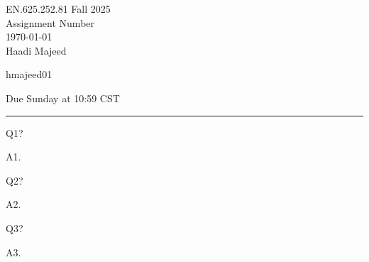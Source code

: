 \documentclass[12pt,letterpaper, onecolumn]{exam}
\begin{document}
\begingroup  
    \centering
    \LARGE EN.625.252.81 Fall 2025\\
    \LARGE Assignment Number\\[0.5em]
    \large \today\\[0.5em]
    \large Haadi Majeed\par
    \large hmajeed01\par
    \large Due Sunday at 10:59 CST\par
\endgroup
\rule{\textwidth}{0.4pt}
\printanswers
\renewcommand{\solutiontitle}{\noindent\textbf{Ans:}\enspace}

\begin{questions}

    \question Q1?
    
    \begin{solution}
            A1.
    \end{solution}
    
    \question Q2? 
    
    \begin{solution}
            A2.
    \end{solution}

    \question Q3?
    
    \begin{solution}
            A3.
    \end{solution}
    
\end{questions}
\end{document}
